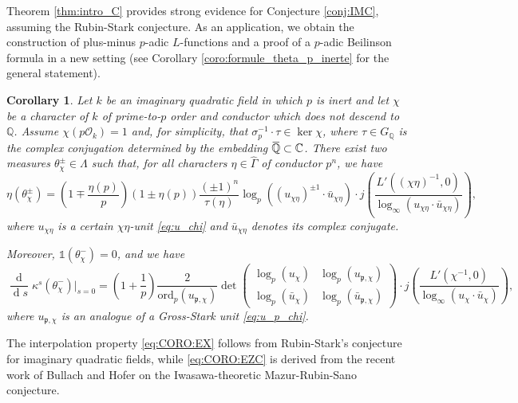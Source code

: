 \documentclass[12pt]{amsart}
\newcommand\bC{\mathbb{C}}
\newcommand\bQ{\mathbb{Q}}
\newcommand\Zp{{\mathbb{Z}_p}}
\newcommand\cL{\mathcal{L}}
\newcommand\cO{\mathcal{O}}
\newcommand\gp{\mathfrak{p}}
\newcommand{\ob}[1]{\mkern 1.5mu\overline{\mkern-1.5mu#1\mkern-1.5mu}\mkern 1.5mu}
\newcommand{\ord}{\mathrm{ord}}
\DeclareMathOperator{\diff}{d}
\theoremstyle{defstyle}
\theoremstyle{thmstyle}
\newtheorem{CORO}{Corollary}
\begin{document}
Theorem \ref{thm:intro_C} provides strong evidence for Conjecture \ref{conj:IMC}, assuming the Rubin-Stark conjecture. As an application, we obtain the construction of plus-minus $p$-adic $L$-functions and a proof of a $p$-adic Beilinson formula in a new setting (see Corollary \ref{coro:formule_theta_p_inerte} for the general statement). 
\begin{CORO}\label{CORO:plus-minus-p-adic-Beilinson}
	Let $k$ be an imaginary quadratic field in which $p$ is inert and let $\chi$ be a character of $k$ of prime-to-$p$ order and conductor which does not descend to $\bQ$. Assume $\chi(p\cO_k)=1$ and, for simplicity, that $\sigma_p^{-1}\cdot\tau\in \ker \chi$, where $\tau\in G_\bQ$ is the complex conjugation determined by the embedding $\ob{\bQ}\subset \bC$. There exist two measures $\theta^\pm_\chi\in\Lambda$ such that, for all characters $\eta\in\widehat{\Gamma}$ of conductor $p^n$, we have
	\begin{equation}\label{eq:CORO:EX}
		\eta(\theta^\pm_\chi)= \left(1\mp\frac{\eta(p)}{p}\right)\left(1\pm{\eta(p)}\right)\frac{(\pm 1)^n}{\tau(\eta)}\log_p((u_{\chi\eta})^{\pm 1}\cdot\bar{u}_{\chi\eta})\cdot j\left(\frac{L'((\chi\eta)^{-1},0)}{\log_\infty(u_{\chi\eta}\cdot \bar{u}_{\chi\eta})}\right),
	\end{equation}
where $u_{\chi\eta}$ is a certain $\chi\eta$-unit \eqref{eq:u_chi} and $\bar{u}_{\chi\eta}$ denotes its complex conjugate. 

Moreover, $\mathds{1}(\theta^-_\chi)=0$, and we have
\begin{equation}\label{eq:CORO:EZC}
	\dfrac{\diff}{\diff \!s}\kappa^s(\theta^-_\chi)\bigg|_{s=0} =\left(1+\frac{1}{p}\right)\frac{2}{\ord_p(u_{\gp,\chi})}\det\begin{pmatrix}\log_p(u_\chi) & \log_p(u_{{\gp},\chi}) \\ \log_p(\bar{u}_{\chi}) & \log_p(\bar{u}_{{\gp},\chi})\end{pmatrix}\cdot j\left(\frac{L'(\chi^{-1},0)}{\log_\infty(u_{\chi}\cdot \bar{u}_{\chi})}\right), 
\end{equation}
where $u_{{\gp},\chi}$ is an analogue of a Gross-Stark unit \eqref{eq:u_p_chi}.
\end{CORO} 
The interpolation property \eqref{eq:CORO:EX} follows from Rubin-Stark's conjecture for imaginary quadratic fields, while \eqref{eq:CORO:EZC} is derived from the recent work of Bullach and Hofer \cite{bullachhofer} on the Iwasawa-theoretic Mazur-Rubin-Sano conjecture.
\end{document}

